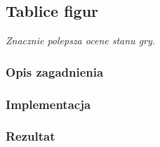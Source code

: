 \subsection{Tablice figur}
\label{subsec:tablice-figur}
\textit{Znacznie polepsza ocene stanu gry.}


\subsubsection{Opis zagadnienia}
\subsubsection{Implementacja}
\subsubsection{Rezultat}